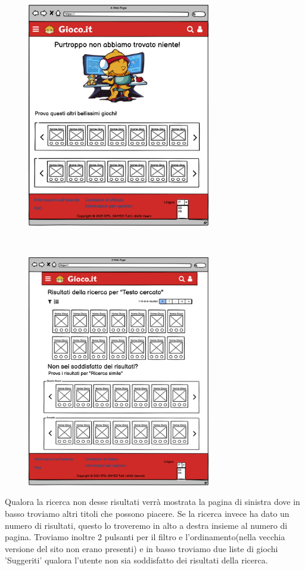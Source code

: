 \documentclass[../Report.tex]{subfiles}
\begin{document}
    \begin{figure}[H]
        \hspace{-1.5cm}
        \begin{minipage}[b]{8cm}
            \centering
            \includegraphics[width=8cm]{WEmpySearchResult.png}
            \end{minipage}
            \ \hspace{2mm} \hspace{3mm} \
            \begin{minipage}[b]{8cm}
            \centering
            \includegraphics[width=8cm]{WSearchResult.png}
        \end{minipage}
    \end{figure}
    Qualora la ricerca non desse risultati verrà mostrata la pagina di sinistra dove in basso troviamo altri titoli che possono piacere.
    Se la ricerca invece ha dato un numero di risultati, questo lo troveremo in alto a destra insieme al numero di pagina. Troviamo inoltre 2 pulsanti per il filtro e l'ordinamento(nella vecchia versione del sito non erano presenti) e in basso troviamo due liste di giochi 'Suggeriti' qualora l'utente non sia soddisfatto dei risultati della ricerca.
\end{document}
